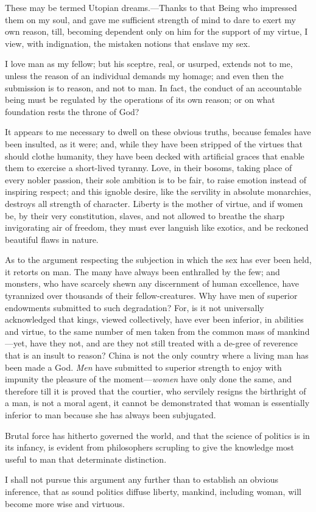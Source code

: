 These may be termed Utopian dreams.---Thanks to that Being who
impressed them on my soul, and gave me sufficient strength of mind to
dare to exert my own reason, till, becoming dependent only on him for
the support of my virtue, I view, with indignation, the mistaken
notions that enslave my sex.

I love man as my fellow; but his sceptre, real, or usurped, extends
not to me, unless the reason of an individual demands my homage; and
even then the submission is to reason, and not to man. In fact, the
conduct of an accountable being must be regulated by the operations of
its own reason; or on what foundation rests the throne of God?

It appears to me necessary to dwell on these obvious truths, because
females have been insulted, as it were; and, while they have been
stripped of the virtues that should clothe  humanity, they
have been decked with artificial graces that enable them to exercise a
short-lived tyranny. Love, in their bosoms, taking place of every
nobler passion, their sole ambition is to be fair, to raise emotion
instead of inspiring respect; and this ignoble desire, like the
servility in absolute monarchies, destroys all strength of character.
Liberty is the mother of virtue, and if women be, by their very
constitution, slaves, and not allowed to breathe the sharp
invigorating air of freedom, they must ever languish like exotics, and
be reckoned beautiful flaws in nature.

As to the argument respecting the subjection in which the sex has ever
been held, it retorts on man. The many have always been enthralled by
the few; and monsters, who have scarcely shewn any discernment of
human excellence, have tyrannized over thousands of their
fellow-creatures. Why have men of superior endowments submitted to
such degradation? For, is it not universally acknowledged that kings,
viewed collectively, have ever been inferior, in abilities and virtue,
to the same number of men taken from the common mass of mankind---yet,
have they not, and are they not still treated with a de-gree
of reverence that is an insult to reason? China is not the only
country where a living man has been made a God. \textit{Men} have
submitted to superior strength to enjoy with impunity the pleasure of
the mo\-ment---\textit{women} have only done the same, and therefore
till it is proved that the courtier, who servilely resigns the
birthright of a man, is not a moral agent, it cannot be demonstrated
that woman is essentially inferior to man because she has always been
subjugated.

Brutal force has hitherto governed the world, and that the science of
politics is in its infancy, is evident from philosophers scrupling to
give the knowledge most useful to man that determinate distinction.

I shall not pursue this argument any further than to establish an
obvious inference, that as sound politics diffuse liberty, mankind,
including woman, will become more wise and virtuous.

